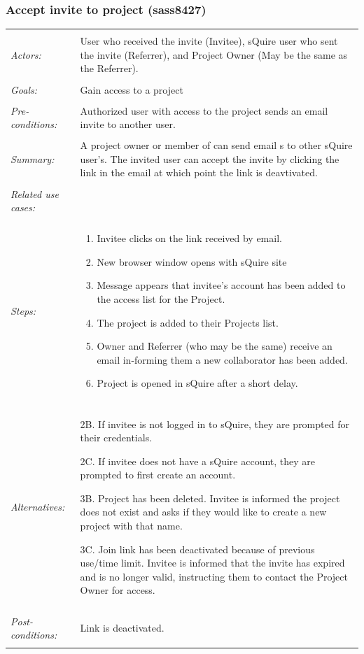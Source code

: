\documentclass[11pt]{report}
\begin{document}
\subsubsection{Accept invite to project (sass8427)}
\begin{tabular}{ p{2cm} p{12cm} }
 \hline
 \\
 \textit{Actors:} & User who received the invite (Invitee), sQuire user who sent the invite (Referrer), and Project Owner (May be the same as the Referrer).  \\ 
 \\
 \textit{Goals:} & Gain access to a project \\
 \\
 \textit{Pre-conditions:} & Authorized user with access to the project sends an email invite to another user.   \\
\\
 \textit{Summary:} & A project owner or member of can send email s to other sQuire user's. The invited user can accept the invite by clicking the link in the email at which point the link is deavtivated. \\ 
 \\
 \textit{Related use cases:} & \\ 
 \\
 \textit{Steps:} & \begin{enumerate}
  \item Invitee clicks on the link received by email. 
  \item New browser window opens with sQuire site
  \item Message appears that invitee's account has been added to the access list for the Project.
  \item The project is added to their Projects list.
  \item Owner and Referrer (who may be the same) receive an email in-forming them a new collaborator has been added.
  \item Project is opened in sQuire after a short delay.
 \end{enumerate} \\
 \\
 \textit{Alternatives:} & 2B. If invitee is not logged in to sQuire, they are prompted for their credentials.
 
	2C. If invitee does not have a sQuire account, they are prompted to first create an account.
	
	3B. Project has been deleted. Invitee is informed the project does not exist and asks if they would like to create a new project with that name.
	
	3C. Join link has been deactivated because of previous use/time limit. Invitee is informed that the invite has expired and is no longer valid, instructing them to contact the Project Owner for access. \\
 \\
 \textit{Post-conditions:} & Link is deactivated.  \\
 \\
\hline
\end{tabular}
\end{document}
